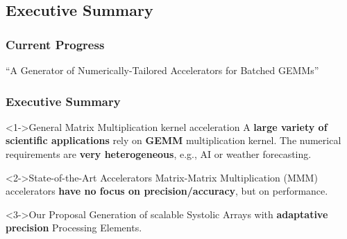 \graphicspath{{../../../PhD/paper_factory/thesis_louis/Chapter4/Figs/}{../../../PhD/paper_factory/thesis_louis/Chapter3/Figs/}}
\subsection{Executive Summary}
\begin{frame}
    \frametitle{Current Progress}

    \centering
    \huge ``A Generator of Numerically-Tailored Accelerators for Batched GEMMs''
    \normalsize

    \vspace{1em} %

    \tableofcontents[currentsection,
                     subsectionstyle=show/shaded/hide,
                     sectionstyle=show/hide]

\end{frame}

\begin{frame}
    \frametitle{Executive Summary}
        \begin{alertblock}<1->{General Matrix Multiplication kernel acceleration}
		A \textbf{large variety of scientific applications} rely on \textbf{GEMM} multiplication kernel. The numerical requirements are \textbf{very heterogeneous}, e.g., AI or weather forecasting.
        \end{alertblock}

        \begin{exampleblock}<2->{State-of-the-Art Accelerators}
		Matrix-Matrix Multiplication (MMM) accelerators \textbf{have no focus on precision/accuracy}, but on performance.
        \end{exampleblock}

        \begin{block}<3->{Our Proposal}
		Generation of scalable Systolic Arrays with \textbf{adaptative precision} Processing Elements.
        \end{block}
\end{frame}


